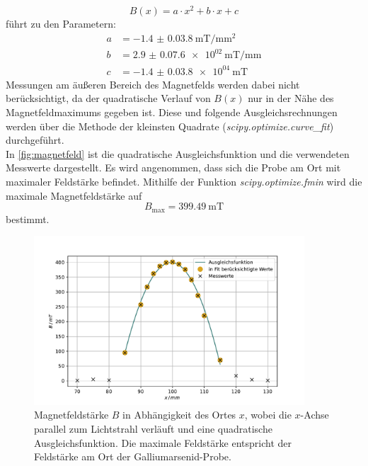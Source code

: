 \begin{equation}
    B(x) = a \cdot x^2 + b \cdot x + c
\end{equation}
führt zu den Parametern:
\begin{align*}
    a &= \qty{-1.4(0.038)}{\milli \tesla / \milli \metre^2} \\
    b &= \qty{2.9(0.076)e+02}{\milli \tesla / \milli \metre} \\
    c &= \qty{-1.4(0.038)e+04}{\milli \tesla}
\end{align*}
Messungen am äußeren Bereich des Magnetfelds werden dabei nicht berücksichtigt, da der quadratische Verlauf von $B(x)$ nur in der Nähe des Magnetfeldmaximums gegeben ist.
Diese und folgende Ausgleichsrechnungen werden über die Methode der kleinsten Quadrate (\textit{scipy.optimize.curve\_fit}\cite{scipy}) durchgeführt.
\\
In \autoref{fig:magnetfeld} ist die quadratische Ausgleichsfunktion und die verwendeten Messwerte dargestellt.
Es wird angenommen, dass sich die Probe am Ort mit maximaler Feldstärke befindet.
Mithilfe der Funktion \textit{scipy.optimize.fmin}\cite{scipy} wird die maximale Magnetfeldstärke auf
\begin{equation}
    B_\text{max} = \qty{399.49}{\milli\tesla}
\end{equation}
bestimmt.

\begin{figure}
    \centering
    \includegraphics[width=0.9\textwidth]{figure/magnetfeld.pdf}
    \caption{Magnetfeldstärke $B$ in Abhängigkeit des Ortes $x$, wobei die $x$-Achse parallel zum Lichtstrahl verläuft und eine quadratische Ausgleichsfunktion.
    Die maximale Feldstärke entspricht der Feldstärke am Ort der Galliumarsenid-Probe.}
    \label{fig:magnetfeld}
\end{figure}
\FloatBarrier

